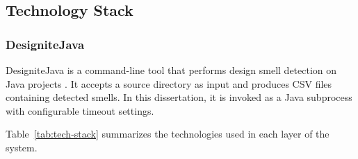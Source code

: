 \subsection{Technology Stack}
\label{subsec:tech-stack}

\subsubsection{DesigniteJava}
\label{subsec:designite-java}

 \par DesigniteJava is a command-line tool that performs design smell detection on Java projects \cite{Sharma2018}. It accepts a source directory as input and produces CSV files containing detected smells. In this dissertation, it is invoked as a Java subprocess with configurable timeout settings.

Table~\ref{tab:tech-stack} summarizes the technologies used in each layer of the system.

